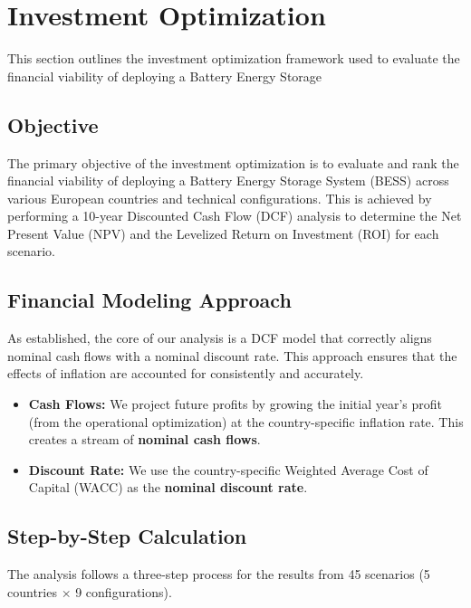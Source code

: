 \section{Investment Optimization}
This section outlines the investment optimization framework used to evaluate the financial viability of deploying a Battery Energy Storage
\subsection{Objective}
The primary objective of the investment optimization is to evaluate and rank the financial viability of deploying a Battery Energy Storage System (BESS) across various European countries and technical configurations. This is achieved by performing a 10-year Discounted Cash Flow (DCF) analysis to determine the Net Present Value (NPV) and the Levelized Return on Investment (ROI) for each scenario.

\subsection{Financial Modeling Approach}
As established, the core of our analysis is a DCF model that correctly aligns nominal cash flows with a nominal discount rate. This approach ensures that the effects of inflation are accounted for consistently and accurately.

\begin{itemize}
    \item \textbf{Cash Flows:} We project future profits by growing the initial year's profit (from the operational optimization) at the country-specific inflation rate. This creates a stream of \textbf{nominal cash flows}.
    \item \textbf{Discount Rate:} We use the country-specific Weighted Average Cost of Capital (WACC) as the \textbf{nominal discount rate}.
\end{itemize}

\subsection{Step-by-Step Calculation}
The analysis follows a three-step process for the results from 45 scenarios (5 countries $\times$ 9 configurations).

